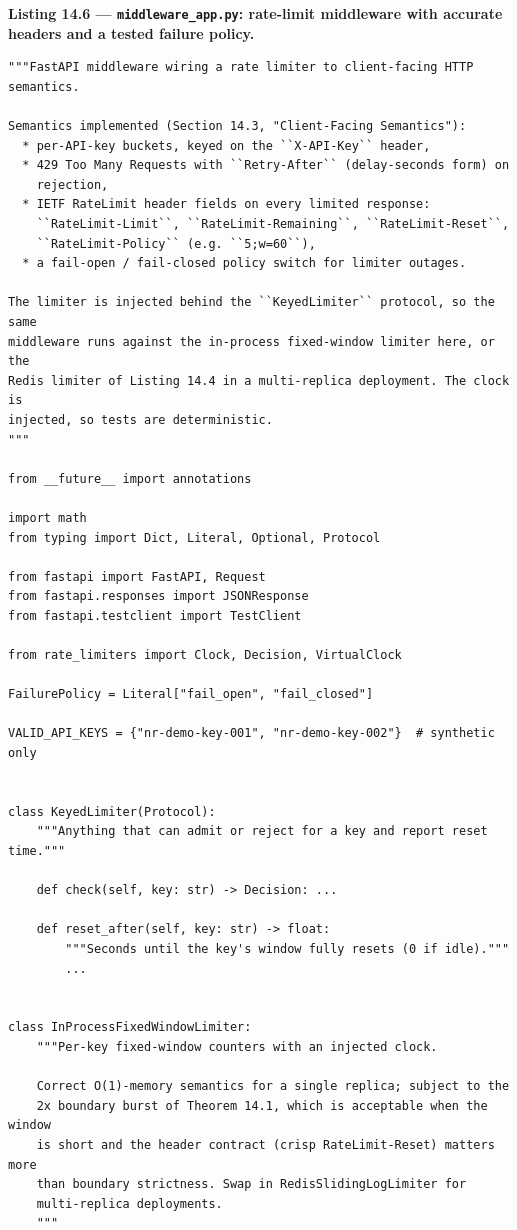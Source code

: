\noindent\textbf{Listing 14.6 --- \texttt{middleware\_app.py}: rate-limit
middleware with accurate headers and a tested failure policy.}
\label{lst:ch14-middleware}
\begin{verbatim}
"""FastAPI middleware wiring a rate limiter to client-facing HTTP semantics.

Semantics implemented (Section 14.3, "Client-Facing Semantics"):
  * per-API-key buckets, keyed on the ``X-API-Key`` header,
  * 429 Too Many Requests with ``Retry-After`` (delay-seconds form) on
    rejection,
  * IETF RateLimit header fields on every limited response:
    ``RateLimit-Limit``, ``RateLimit-Remaining``, ``RateLimit-Reset``,
    ``RateLimit-Policy`` (e.g. ``5;w=60``),
  * a fail-open / fail-closed policy switch for limiter outages.

The limiter is injected behind the ``KeyedLimiter`` protocol, so the same
middleware runs against the in-process fixed-window limiter here, or the
Redis limiter of Listing 14.4 in a multi-replica deployment. The clock is
injected, so tests are deterministic.
"""

from __future__ import annotations

import math
from typing import Dict, Literal, Optional, Protocol

from fastapi import FastAPI, Request
from fastapi.responses import JSONResponse
from fastapi.testclient import TestClient

from rate_limiters import Clock, Decision, VirtualClock

FailurePolicy = Literal["fail_open", "fail_closed"]

VALID_API_KEYS = {"nr-demo-key-001", "nr-demo-key-002"}  # synthetic only


class KeyedLimiter(Protocol):
    """Anything that can admit or reject for a key and report reset time."""

    def check(self, key: str) -> Decision: ...

    def reset_after(self, key: str) -> float:
        """Seconds until the key's window fully resets (0 if idle)."""
        ...


class InProcessFixedWindowLimiter:
    """Per-key fixed-window counters with an injected clock.

    Correct O(1)-memory semantics for a single replica; subject to the
    2x boundary burst of Theorem 14.1, which is acceptable when the window
    is short and the header contract (crisp RateLimit-Reset) matters more
    than boundary strictness. Swap in RedisSlidingLogLimiter for
    multi-replica deployments.
    """


\end{verbatim}
